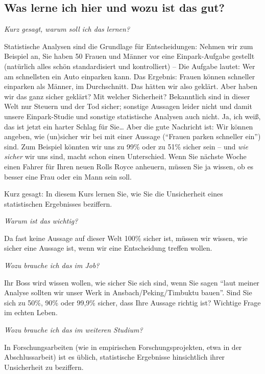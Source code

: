 \documentclass[
  ngerman,
  letterpaper,
  twoside,
  open=any]{scrbook}
\theoremstyle{definition}
\theoremstyle{plain}
\theoremstyle{definition}
\theoremstyle{definition}
\theoremstyle{remark}
\begin{document}
\subsection{Was lerne ich hier und wozu ist das
gut?}\label{was-lerne-ich-hier-und-wozu-ist-das-gut}

\emph{Kurz gesagt, warum soll ich das lernen?}

Statistische Analysen sind die Grundlage für Entscheidungen: Nehmen wir
zum Beispiel an, Sie haben 50 Frauen und Männer vor eine Einpark-Aufgabe
gestellt (natürlich alles schön standardisiert und kontrolliert) -- Die
Aufgabe lautet: Wer am schnellsten ein Auto einparken kann. Das
Ergebnis: Frauen können schneller einparken als Männer, im Durchschnitt.
Das hätten wir also geklärt. Aber haben wir das ganz sicher geklärt? Mit
welcher Sicherheit? Bekanntlich sind in dieser Welt nur Steuern und der
Tod sicher; sonstige Aussagen leider nicht und damit unsere
Einpark-Studie und sonstige statistische Analysen auch nicht. Ja, ich
weiß, das ist jetzt ein harter Schlag für Sie\ldots{} Aber die gute
Nachricht ist: Wir können angeben, wie (un)sicher wir bei mit einer
Aussage (\enquote{Frauen parken schneller ein}) sind. Zum Beispiel
könnten wir uns zu 99\% oder zu 51\% sicher sein -- und \emph{wie
sicher} wir uns sind, macht schon einen Unterschied. Wenn Sie nächste
Woche einen Fahrer für Ihren neuen Rolls Royce anheuern, müssen Sie ja
wissen, ob es besser eine Frau oder ein Mann sein soll.

Kurz gesagt: In diesem Kurs lernen Sie, wie Sie die Unsicherheit eines
statistischen Ergebnisses beziffern.

\emph{Warum ist das wichtig?}

Da fast keine Aussage auf dieser Welt 100\% sicher ist, müssen wir
wissen, wie sicher eine Aussage ist, wenn wir eine Entscheidung treffen
wollen.

\emph{Wozu brauche ich das im Job?}

Ihr Boss wird wissen wollen, wie sicher Sie sich sind, wenn Sie sagen
\enquote{laut meiner Analyse sollten wir unser Werk in
Ansbach/Peking/Timbuktu bauen}. Sind Sie sich zu 50\%, 90\% oder 99,9\%
sicher, dass Ihre Aussage richtig ist? Wichtige Frage im echten Leben.

\emph{Wozu brauche ich das im weiteren Studium?}

In Forschungsarbeiten (wie in empirischen Forschungsprojekten, etwa in
der Abschlussarbeit) ist es üblich, statistische Ergebnisse hinsichtlich
ihrer Unsicherheit zu beziffern.
\end{document}
